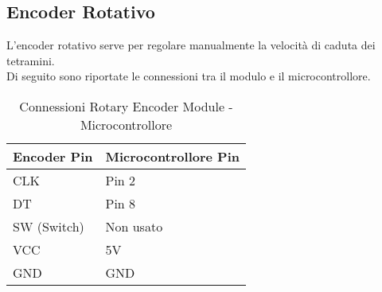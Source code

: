 \documentclass[a4paper, 12pt]{article}
\begin{document}
\subsection{Encoder Rotativo}
L'encoder rotativo serve per regolare manualmente la velocità di caduta dei tetramini.\\
Di seguito sono riportate le connessioni tra il modulo e il microcontrollore.
\begin{table}[H]
  \centering
  \caption{Connessioni Rotary Encoder Module - Microcontrollore}
  \label{tab:rotary-encoder-connections}
  \begin{tabular}{ll}
    \toprule
    \textbf{Encoder Pin} & \textbf{Microcontrollore Pin} \\
    \midrule
    CLK           & Pin 2   \\
    DT            & Pin 8   \\
    SW (Switch)   & Non usato \\
    VCC           & 5V      \\
    GND           & GND     \\
    \bottomrule
  \end{tabular}
\end{table}
\end{document}
